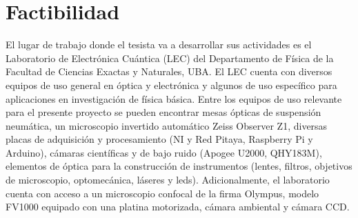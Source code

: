 \documentclass{ctuthesis}
\def\checkmark{\tikz\fill[scale=0.4](0,.35) -- (.25,0) -- (1,.7) -- (.25,.15) -- cycle;}
\begin{document}



\section*{Factibilidad}

\hspace{0.5cm}El lugar de trabajo donde el tesista va a desarrollar sus 
actividades es el 
Laboratorio de Electrónica Cuántica (LEC) del Departamento de Física de la 
Facultad de Ciencias Exactas y Naturales, UBA. El LEC cuenta con diversos 
equipos de uso general en óptica y electrónica y algunos de uso específico para 
aplicaciones en investigación de física básica. Entre los equipos de uso 
relevante para el presente proyecto se pueden encontrar mesas ópticas de 
suspensión neumática, un microscopio invertido automático Zeiss Observer Z1, 
diversas placas de adquisición y procesamiento (NI y Red Pitaya, Raspberry Pi y 
Arduino), cámaras científicas y de bajo ruido (Apogee U2000, QHY183M), 
elementos de óptica para la construcción de instrumentos (lentes, filtros, 
objetivos de microscopio, optomecánica, láseres y leds). Adicionalmente, el 
laboratorio cuenta con acceso a un microscopio confocal de la firma Olympus, 
modelo FV1000 equipado con una platina motorizada, cámara ambiental y cámara 
CCD.
 
\end{document}
